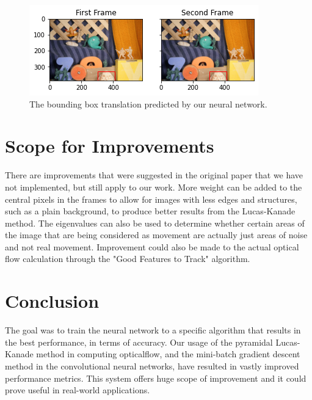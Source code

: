 \documentclass[]{article}
\begin{document}
    \begin{figure}[H]
        \centering
        \includegraphics[width=\textwidth]{index2.png}
        \caption{The bounding box translation predicted by our neural network.}
        \label{fig:optical_flow_neural_net_2}
    \end{figure}


    \section{Scope for Improvements}\label{sec:improvements}
    There are improvements that were suggested in the original paper that we have not implemented, but still apply to our work.
    More weight can be added to the central pixels in the frames to allow for images with less edges and structures, such as a plain background, to produce better results from the Lucas-Kanade method.
    The eigenvalues can also be used to determine whether certain areas of the image that are being considered as movement are actually just areas of noise and not real movement.
    Improvement could also be made to the actual optical flow calculation through the "Good Features to Track" algorithm.\cite{features}


    \section{Conclusion}\label{sec:conclusion}
    The goal was to train the neural network to a specific algorithm that results in the best performance, in terms of accuracy.
    Our usage of the pyramidal Lucas-Kanade method in computing opticalflow, and the mini-batch gradient descent method in the convolutional neural networks, have resulted in vastly improved performance metrics.
    This system offers huge scope of improvement and it could prove useful in real-world applications.
\end{document}
